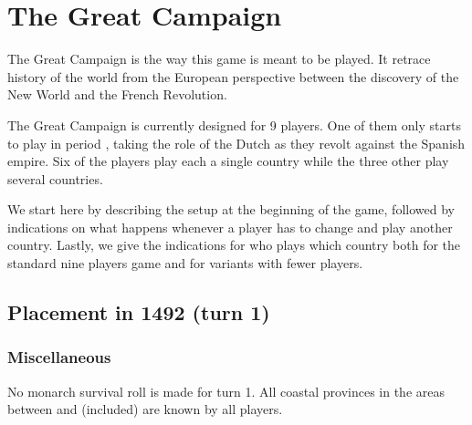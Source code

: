 

\section{The Great Campaign}
\begin{designnote}
  The Great Campaign is the way this game is meant to be played. It retrace
  history of the world from the European perspective between the discovery of
  the New World and the French Revolution.

  The Great Campaign is currently designed for 9 players. One of them only
  starts to play in period , taking the role of the Dutch as they
  revolt against the Spanish empire. Six of the players play each a single
  country while the three other play several countries.

  We start here by describing the setup at the beginning of the game, followed
  by indications on what happens whenever a player has to change and play
  another country. Lastly, we give the indications for who plays which country
  both for the standard nine players game and for variants with fewer
  players.
\end{designnote}




\subsection{Placement in 1492 (turn 1)}


\subsubsection{Miscellaneous}
\aparag No monarch survival roll is made for turn 1.
 All coastal provinces in the areas between
\granderegionBalouchistan and \granderegionNankin (included) are known by all
players.

